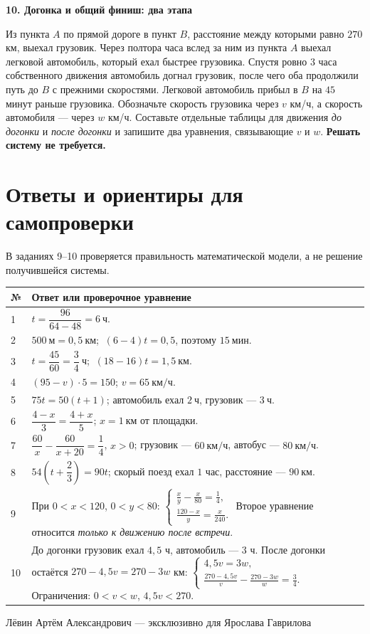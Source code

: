 \documentclass[a4paper,12pt]{article}
\newcommand{\task}[2]{\Needspace{9\baselineskip}\par\noindent\textbf{\textcolor{darkaccent}{#1.} #2}\par}
\newcommand{\smallnote}[1]{{\small\color{muted}#1}}
\begin{document}
\task{10}{Догонка и общий финиш: два этапа}
Из пункта $A$ по прямой дороге в пункт $B$, расстояние между которыми равно $270$ км, выехал грузовик. Через полтора часа вслед за ним из пункта $A$ выехал легковой автомобиль, который ехал быстрее грузовика. Спустя ровно $3$ часа собственного движения автомобиль догнал грузовик, после чего оба продолжили путь до $B$ с прежними скоростями. Легковой автомобиль прибыл в $B$ на $45$ минут раньше грузовика. Обозначьте скорость грузовика через $v$ км/ч, а скорость автомобиля --- через $w$ км/ч. Составьте отдельные таблицы для движения \emph{до догонки} и \emph{после догонки} и запишите два уравнения, связывающие $v$ и $w$. \textbf{Решать систему не требуется.}

\clearpage
\section*{Ответы и ориентиры для самопроверки}
\smallnote{В заданиях 9--10 проверяется правильность математической модели, а не решение получившейся системы.}
\vspace{4mm}
\renewcommand{\arraystretch}{1.5}
\begin{longtable}{@{}p{.075\linewidth}p{.855\linewidth}@{}}
\toprule
№ & Ответ или проверочное уравнение\\
\midrule
\endhead
1 & $t=\dfrac{96}{64-48}=\boxed{6\ \text{ч}}$.\\
2 & $500\ \text{м}=0{,}5\ \text{км}$; $\ (6-4)t=0{,}5$, поэтому $\boxed{15\ \text{мин}}$.\\
3 & $t=\dfrac{45}{60}=\dfrac34\ \text{ч}$; $\ (18-16)t=\boxed{1{,}5\ \text{км}}$.\\
4 & $(95-v)\cdot5=150$; $\boxed{v=65\ \text{км/ч}}$.\\
5 & $75t=50(t+1)$; автомобиль ехал $\boxed{2\ \text{ч}}$, грузовик --- $\boxed{3\ \text{ч}}$.\\
6 & $\dfrac{4-x}{3}=\dfrac{4+x}{5}$; $\boxed{x=1\ \text{км}}$ от площадки.\\
7 & $\dfrac{60}{x}-\dfrac{60}{x+20}=\dfrac14$, $x>0$; грузовик --- $\boxed{60\ \text{км/ч}}$, автобус --- $\boxed{80\ \text{км/ч}}$.\\
8 & $54\left(t+\dfrac23\right)=90t$; скорый поезд ехал $1$ час, расстояние --- $\boxed{90\ \text{км}}$.\\
9 & При $0<x<120$, $0<y<80$:
$\displaystyle\begin{cases}
\frac{x}{y}-\frac{x}{80}=\frac14,\\[4pt]
\frac{120-x}{y}=\frac{x}{240}.
\end{cases}$
Второе уравнение относится \emph{только к движению после встречи}.\\
10 & До догонки грузовик ехал $4{,}5$ ч, автомобиль --- $3$ ч. После догонки остаётся $270-4{,}5v=270-3w$ км:
$\displaystyle\begin{cases}
4{,}5v=3w,\\[4pt]
\frac{270-4{,}5v}{v}-\frac{270-3w}{w}=\frac34.
\end{cases}$
Ограничения: $0<v<w$, $4{,}5v<270$.\\
\bottomrule
\end{longtable}

\vfill
\begin{center}
\small\color{muted} Лёвин Артём Александрович --- эксклюзивно для Ярослава Гаврилова
\end{center}
\end{document}
